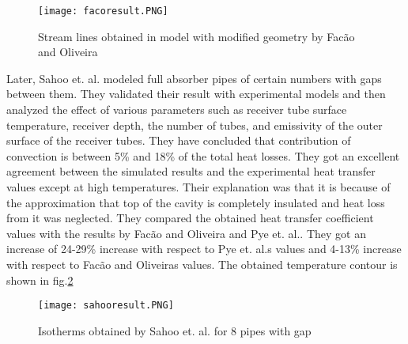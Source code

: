 \begin{figure}[H]
\begin{center}
\texttt{[image: facoresult.PNG]}
\caption{ Stream lines obtained in model with modified geometry by Fac\~ao and Oliveira\citep{FACAO201190}}
\end{center}
\label{facaoresult}
\end{figure}


Later, Sahoo et. al.\citep{SAHOO201318} modeled full absorber pipes of certain numbers with gaps between them. They validated their result with experimental models and then analyzed the effect of various parameters such as receiver tube surface temperature, receiver depth, the number of tubes, and emissivity of the outer surface of the receiver tubes. They have concluded that contribution of convection is between 5\% and 18\% of the total heat losses. They got an excellent agreement between the simulated results and the experimental heat transfer values except at high temperatures. Their explanation was that it is because of the approximation that top of the cavity is completely insulated and heat loss from it was neglected. They compared the obtained heat transfer coefficient values with the results by Fac\~ao and Oliveira\citep{FACAO201190} and Pye et. al.\citep{pye2003modelling}. They got an increase of 24-29\% increase with respect to Pye et. al.\textquotesingle s values and 4-13\% increase with respect to Fac\~ao and Oliveira\textquotesingle s values. The obtained temperature contour is shown in fig.\ref{sahooresult}

\begin{figure}[H]
\begin{center}
\texttt{[image: sahooresult.PNG]}
\caption{Isotherms obtained by Sahoo et. al. for 8 pipes with gap\citep{SAHOO201318}}
\end{center}
\label{sahooresult}
\end{figure}

